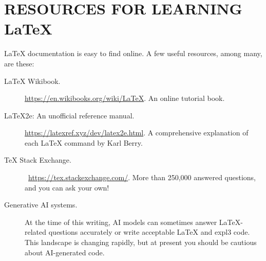 \documentclass[11pt]{article}
\begin{document}
\section[RESOURCES FOR LEARNING LATEX]{RESOURCES FOR LEARNING \LaTeX}
\LaTeX{} documentation is easy to find online. A few useful resources, among many, are these:
\begin{description}
\item[\LaTeX{} Wikibook.] \url{https://en.wikibooks.org/wiki/LaTeX}. An online tutorial book.
\item[\LaTeX 2e: An unofficial reference manual.] \url{https://latexref.xyz/dev/latex2e.html}. A comprehensive explanation of each \LaTeX{} command by Karl Berry. 
\item[\TeX{} Stack Exchange.]\ \url{https://tex.stackexchange.com/}. More than 250,000 answered questions, and you can ask your own!
\item[Generative AI systems.] At the time of this writing, AI models can sometimes answer \LaTeX-related questions accurately or write acceptable \LaTeX{} and expl3 code. This landscape is changing rapidly, but at present you should be cautious about AI-generated code.
\end{description}

\vskip 30pt


\vskip 30pt

\printbibliography[title={\refname},heading=bibintoc]
\end{document}
